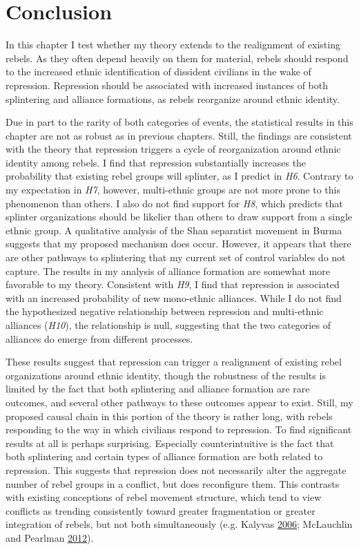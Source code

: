 \documentclass[12pt,]{book}
\theoremstyle{definition}
\theoremstyle{definition}
\theoremstyle{remark}
\begin{document}
\section{Conclusion}\label{conclusion}

In this chapter I test whether my theory extends to the realignment of
existing rebels. As they often depend heavily on them for material,
rebels should respond to the increased ethnic identification of
dissident civilians in the wake of repression. Repression should be
associated with increased instances of both splintering and alliance
formations, as rebels reorganize around ethnic identity.

Due in part to the rarity of both categories of events, the statistical
results in this chapter are not as robust as in previous chapters.
Still, the findings are consistent with the theory that repression
triggers a cycle of reorganization around ethnic identity among rebels.
I find that repression substantially increases the probability that
existing rebel groups will splinter, as I predict in \emph{H6}. Contrary
to my expectation in \emph{H7}, however, multi-ethnic groups are not
more prone to this phenomenon than others. I also do not find support
for \emph{H8}, which predicts that splinter organizations should be
likelier than others to draw support from a single ethnic group. A
qualitative analysis of the Shan separatist movement in Burma suggests
that my proposed mechanism does occur. However, it appears that there
are other pathways to splintering that my current set of control
variables do not capture. The results in my analysis of alliance
formation are somewhat more favorable to my theory. Consistent with
\emph{H9}, I find that repression is associated with an increased
probability of new mono-ethnic alliances. While I do not find the
hypothesized negative relationship between repression and multi-ethnic
alliances (\emph{H10}), the relationship is null, suggesting that the
two categories of alliances do emerge from different processes.

These results suggest that repression can trigger a realignment of
existing rebel organizations around ethnic identity, though the
robustness of the results is limited by the fact that both splintering
and alliance formation are rare outcomes, and several other pathways to
these outcomes appear to exist. Still, my proposed causal chain in this
portion of the theory is rather long, with rebels responding to the way
in which civilians respond to repression. To find significant results at
all is perhaps surprising. Especially counterintuitive is the fact that
both splintering and certain types of alliance formation are both
related to repression. This suggests that repression does not
necessarily alter the aggregate number of rebel groups in a conflict,
but does reconfigure them. This contrasts with existing conceptions of
rebel movement structure, which tend to view conflicts as trending
consistently toward greater fragmentation or greater integration of
rebels, but not both simultaneously (e.g. Kalyvas
\protect\hyperlink{ref-Kalyvas2006}{2006}; McLauchlin and Pearlman
\protect\hyperlink{ref-McLauchlin2012}{2012}).
\end{document}
